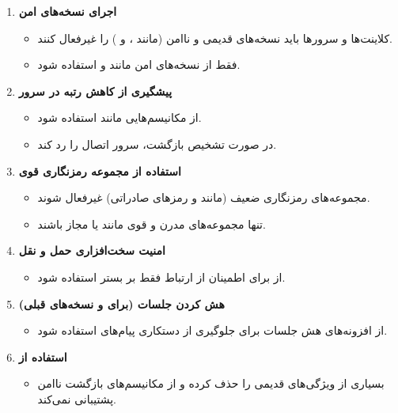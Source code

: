 \begin{enumerate}
    \item \textbf{اجرای نسخه‌های امن }
        \begin{itemize}
            \item کلاینت‌ها و سرورها باید نسخه‌های قدیمی و ناامن  (مانند ،  و ) را غیرفعال کنند.
            \item فقط از نسخه‌های امن مانند  و  استفاده شود.
        \end{itemize}

    \item \textbf{پیشگیری از کاهش رتبه در سرور}
        \begin{itemize}
            \item از مکانیسم‌هایی مانند  استفاده شود.
            \item در صورت تشخیص بازگشت، سرور اتصال را رد کند.
        \end{itemize}

    \item \textbf{استفاده از مجموعه رمزنگاری قوی}
        \begin{itemize}
            \item مجموعه‌های رمزنگاری ضعیف (مانند  و رمزهای صادراتی) غیرفعال شوند.
            \item تنها مجموعه‌های مدرن و قوی مانند  یا  مجاز باشند.
        \end{itemize}

    \item \textbf{امنیت سخت‌افزاری حمل و نقل}
        \begin{itemize}
            \item از  برای اطمینان از ارتباط فقط بر بستر  استفاده شود.
        \end{itemize}

    \item \textbf{هش کردن جلسات (برای  و نسخه‌های قبلی)}
        \begin{itemize}
            \item از افزونه‌های هش جلسات برای جلوگیری از دستکاری پیام‌های  استفاده شود.
        \end{itemize}

    \item \textbf{استفاده از }
        \begin{itemize}
            \item {} بسیاری از ویژگی‌های قدیمی را حذف کرده و از مکانیسم‌های بازگشت ناامن پشتیبانی نمی‌کند.
        \end{itemize}


\end{enumerate}
